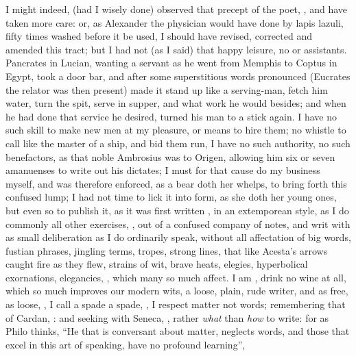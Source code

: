 I might indeed, (had I wisely done) observed that precept of the poet,
, and have taken more care: or, as
Alexander the physician would have done by lapis lazuli, fifty times washed
before it be used, I should have revised, corrected and amended this tract; but
I had not (as I said) that happy leisure, no  or assistants. Pancrates in Lucian,
wanting a servant as he went from Memphis to Coptus in Egypt, took a door bar,
and after some superstitious words pronounced (Eucrates the relator was then
present) made it stand up like a serving-man, fetch him water, turn the spit,
serve in supper, and what work he would besides; and when he had done that
service he desired, turned his man to a stick again. I have no such skill to
make new men at my pleasure, or means to hire them; no whistle to call like the
master of a ship, and bid them run, \etc{} I have no such authority, no such
benefactors, as that noble Ambrosius was to Origen,
allowing him six or seven amanuenses to write out his dictates; I must for that
cause do my business myself, and was therefore enforced, as a bear doth her
whelps, to bring forth this confused lump; I had not time to lick it into form,
as she doth her young ones, but even so to publish it, as it was first written
, in an extemporean style, as
I do commonly all other exercises, , out of a confused company of notes, and writ with as
small deliberation as I do ordinarily speak, without all affectation of big
words, fustian phrases, jingling terms, tropes, strong lines, that like
Acesta's arrows caught fire as they flew, strains of wit,
brave heats, elegies, hyperbolical exornations, elegancies, \etc{}, which many
so much affect. I am , drink no wine at
all, which so much improves our modern wits, a loose, plain, rude writer,
 and as free, as loose, , I call a spade a spade, , I respect matter not words; remembering that of
Cardan, : and seeking with Seneca,
, rather \emph{what} than \emph{how} to
write: for as Philo thinks, \enquote{He that is conversant about
matter, neglects words, and those that excel in this art of speaking, have no
profound learning},


